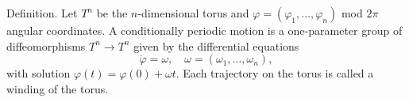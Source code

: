 Definition. Let $T^n$ be the $n$-dimensional torus and $\varphi = (\varphi_1, \ldots, \varphi_n)$ mod $2\pi$ angular coordinates. A conditionally periodic motion is a one-parameter group of diffeomorphisms $T^n \to T^n$ given by the differential equations
$$\dot{\varphi} = \omega, \quad \omega = (\omega_1, \ldots, \omega_n),$$
with solution $\varphi(t) = \varphi(0) + \omega t$. Each trajectory on the torus is called a winding of the torus.

